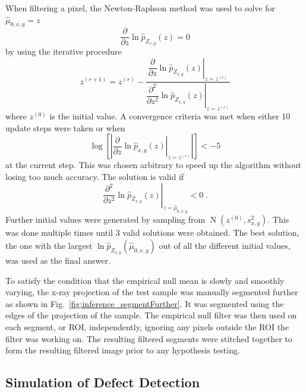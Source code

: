 \documentclass{article}
\DeclareMathOperator{\normal}{N}
\begin{document}
When filtering a pixel, the Newton-Raphson method was used to solve for $\widehat{\mu}_{0,x,y}=z$
\begin{equation}
  \dfrac{\partial}{\partial z}\ln\widehat{p}_{Z_{x,y}}(z) = 0
\end{equation}
by using the iterative procedure
\begin{equation}
  z^{(r+1)} =
  z^{(r)}
  -\dfrac{
    \left.
      \dfrac{
        \partial
      }
      {
        \partial z
      }
      \ln\widehat{p}_{Z_{x,y}}(z)
    \right|_{z = z^{(r)}}
  }
  {
    \left.
      \dfrac{
        \partial^2
      }
      {
        \partial z^2
      }
      \ln\widehat{p}_{Z_{x,y}}(z)
    \right|_{z = z^{(r)}}
  } 
\end{equation}
where $z^{(0)}$ is the initial value. A convergence criteria was met when either 10 update steps were taken or when
\begin{equation}
  \log\left[\left|
    \left.
    \dfrac{
      \partial
    }
    {
      \partial z
    }
  \ln\widehat{p}_{x,y}(z)
  \right|_{z=z^{(r)}}
  \right|\right]
  <-5
\end{equation}
at the current step. This was chosen arbitrary to speed up the algorithm without losing too much accuracy. The solution is valid if
\begin{equation}
  \left.
    \dfrac{
      \partial^2
    }
    {
      \partial z^2
    }
    \ln\widehat{p}_{Z_{x,y}}(z)
  \right|_{z=\widehat{\mu}_{0,x,y}}
  < 0 \ .
\end{equation}
Further initial values were generated by sampling from $\normal(z^{(0)}, s_{x,y}^2)$. This was done multiple times until 3 valid solutions were obtained. The best solution, the one with the largest $\ln\widehat{p}_{Z_{x,y}}\left(\widehat{\mu}_{0,x,y}\right)$ out of all the different initial values, was used as the final answer.

To satisfy the condition that the empirical null mean is slowly and smoothly varying, the x-ray projection of the test sample was manually segmented further as shown in Fig.~\ref{fig:inference_segmentFurther}. It was segmented using the edges of the projection of the sample. The empirical null filter was then used on each segment, or ROI, independently, ignoring any pixels outside the ROI the filter was working on. The resulting filtered segments were stitched together to form the resulting filtered image prior to any hypothesis testing.

\subsection{Simulation of Defect Detection}
\label{subsection:simulation}
\end{document}
